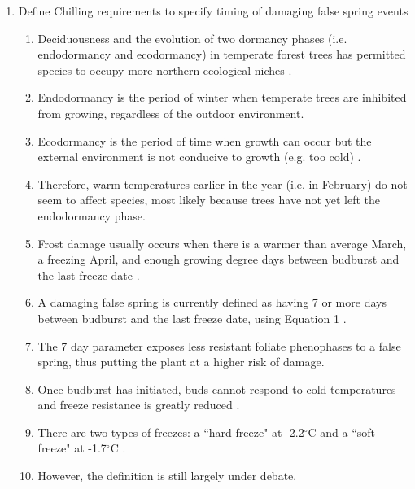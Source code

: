\documentclass{article}\usepackage[]{graphicx}\usepackage[]{color}
\begin{document}
\begin{enumerate}
\item Define Chilling requirements to specify timing of damaging false spring events
\begin {enumerate}
\item Deciduousness and the evolution of two dormancy phases (i.e. endodormancy and ecodormancy) in temperate forest trees has permitted species to occupy more northern ecological niches \citep{Samish1954}.
\item Endodormancy is the period of winter when temperate trees are inhibited from growing, regardless of the outdoor environment.
\item Ecodormancy is the period of time when growth can occur but the external environment is not conducive to growth (e.g. too cold) \citep{Basler2012}.
\item Therefore, warm temperatures earlier in the year (i.e. in February) do not seem to affect species, most likely because trees have not yet left the endodormancy phase.
\item Frost damage usually occurs when there is a warmer than average March, a freezing April, and enough growing degree days between budburst and the last freeze date \citep{Augspurger2013}.
\item A damaging false spring is currently defined as having 7 or more days between budburst and the last freeze date, using Equation 1 \citep{Peterson2014}.
\item The 7 day parameter exposes less resistant foliate phenophases to a false spring, thus putting the plant at a higher risk of damage. 
\item Once budburst has initiated, buds cannot respond to cold temperatures and freeze resistance is greatly reduced \citep{Taschler2004, Lenz2013, Vitasse2014}.
\item There are two types of freezes: a ``hard freeze" at -2.2$^{\circ}$C and a ``soft freeze" at -1.7$^{\circ}$C \citep{Vavrus2006, Kodra2011, Augspurger2013}.
\item However, the definition is still largely under debate. 
\end{enumerate}


\end{enumerate}
\end{document}
